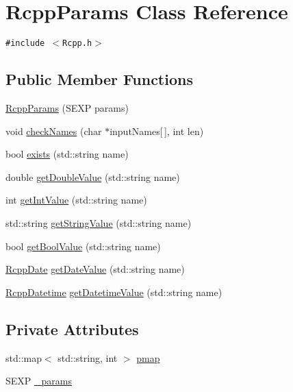 \hypertarget{classRcppParams}{
\section{RcppParams Class Reference}
\label{classRcppParams}
}
{\tt \#include $<$Rcpp.h$>$}

\subsection*{Public Member Functions}
\begin{CompactItemize}
\item 
\hyperlink{classRcppParams_7315d083ee0d1d0ca00c3aad0175d524}{RcppParams} (SEXP params)
\item 
void \hyperlink{classRcppParams_1b8feaf39d3ffdf0f6773c44ac53736c}{checkNames} (char $\ast$inputNames\mbox{[}$\,$\mbox{]}, int len)
\item 
bool \hyperlink{classRcppParams_989141ab2a8800b97d91bfb43420c6bc}{exists} (std::string name)
\item 
double \hyperlink{classRcppParams_a45f8bc1cd8a64aa9a98e24158407077}{getDoubleValue} (std::string name)
\item 
int \hyperlink{classRcppParams_bb554151641ab12a793f28d3d081973a}{getIntValue} (std::string name)
\item 
std::string \hyperlink{classRcppParams_dc04f4552582eeec09b0806ddd8e2581}{getStringValue} (std::string name)
\item 
bool \hyperlink{classRcppParams_d818a50a0e269360f3f74c5259dec882}{getBoolValue} (std::string name)
\item 
\hyperlink{classRcppDate}{RcppDate} \hyperlink{classRcppParams_ae20c7ee73aa2f1176837cc9387ad008}{getDateValue} (std::string name)
\item 
\hyperlink{classRcppDatetime}{RcppDatetime} \hyperlink{classRcppParams_a4bec8bfe32d5079e64dc1c9a8fcf1b9}{getDatetimeValue} (std::string name)
\end{CompactItemize}
\subsection*{Private Attributes}
\begin{CompactItemize}
\item 
std::map$<$ std::string, int $>$ \hyperlink{classRcppParams_399697fc90ba3136c61dd6e20931bd8b}{pmap}
\item 
SEXP \hyperlink{classRcppParams_3040dda3b32eff66fb73d3ba3874ca5b}{\_\-params}
\end{CompactItemize}



